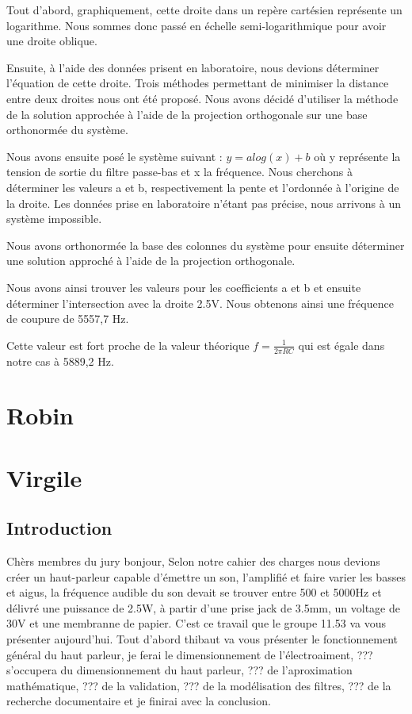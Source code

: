 \documentclass{article}
\begin{document}
Tout d'abord, graphiquement, cette droite dans un repère cartésien représente un logarithme. Nous sommes donc passé en échelle semi-logarithmique pour avoir une droite oblique.

Ensuite, à l'aide des données prisent en laboratoire, nous devions déterminer l'équation de cette droite. Trois méthodes permettant de minimiser la distance entre deux droites nous ont été proposé. Nous avons décidé d'utiliser
la méthode de la solution approchée à l'aide de la projection orthogonale sur une base orthonormée du système. 

Nous avons ensuite posé le système suivant : $y = a log(x) + b$ où y représente la tension de sortie du filtre passe-bas et x la fréquence. Nous cherchons à déterminer les valeurs a et b, 
respectivement la pente et l'ordonnée à l'origine de la droite. Les données prise en laboratoire n'étant pas précise, nous arrivons à un système impossible. 

Nous avons orthonormée la base des colonnes du système pour ensuite  déterminer une solution approché à l'aide de la projection orthogonale. 

Nous avons ainsi trouver les valeurs pour les coefficients a et b et ensuite déterminer l'intersection avec la droite 2.5V.
Nous obtenons ainsi une fréquence de coupure de 5557,7 Hz. 

Cette valeur est fort proche de la valeur théorique $f = \frac{1}{2\pi RC}$ qui est égale dans notre cas à 5889,2 Hz.

\section{Robin}

\section{Virgile}
\subsection{Introduction}
Chèrs membres du jury bonjour,
Selon notre cahier des charges nous devions créer un haut-parleur capable d'émettre un son,
l'amplifié et faire varier les basses et aigus, la fréquence audible du son devait se trouver entre 500 et 5000Hz
et délivré une puissance de 2.5W, à partir d'une prise jack de 3.5mm, un voltage de 30V et une membranne de papier.
C'est ce travail que le groupe 11.53 va vous présenter aujourd'hui.
Tout d'abord thibaut va vous présenter le fonctionnement général du haut parleur,
je ferai le dimensionnement de l'électroaiment, ??? s'occupera du dimensionnement du haut parleur,
??? de l'aproximation mathématique, ??? de la validation, ??? de la modélisation des filtres,
??? de la recherche documentaire et je finirai avec la conclusion.
\end{document}

